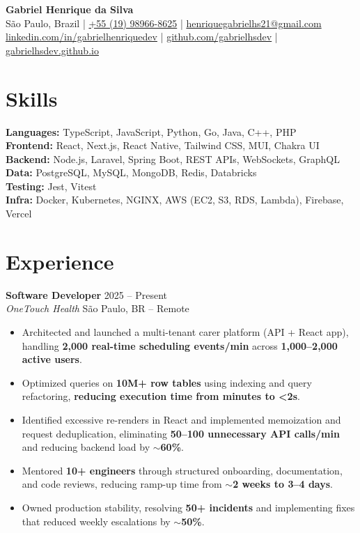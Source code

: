 \documentclass[11pt, a4paper]{article}
\begin{document}
\begin{center}
    {\LARGE\bfseries Gabriel Henrique da Silva} \\[3pt]
    S\~{a}o Paulo, Brazil \quad|\quad
    \href{tel:+5519989668625}{+55 (19) 98966-8625} \quad|\quad
    \href{mailto:henriquegabrielhs21@gmail.com}{henriquegabrielhs21@gmail.com} \\[2pt]
    \href{https://www.linkedin.com/in/gabrielhenriquedev}{linkedin.com/in/gabrielhenriquedev} \quad|\quad
    \href{https://github.com/gabrielhsdev}{github.com/gabrielhsdev}
    \quad|\quad
    \href{https://gabrielhsdev.github.io}{gabrielhsdev.github.io}
\end{center}

\section{Skills}

\textbf{Languages:} TypeScript, JavaScript, Python, Go, Java, C++, PHP \\
\textbf{Frontend:} React, Next.js, React Native, Tailwind CSS, MUI, Chakra UI \\
\textbf{Backend:} Node.js, Laravel, Spring Boot, REST APIs, WebSockets, GraphQL \\
\textbf{Data:} PostgreSQL, MySQL, MongoDB, Redis, Databricks \\
\textbf{Testing:} Jest, Vitest \\
\textbf{Infra:} Docker, Kubernetes, NGINX, AWS (EC2, S3, RDS, Lambda), Firebase, Vercel \\

\section{Experience}

\textbf{Software Developer} \hfill 2025 -- Present \\
\textit{OneTouch Health} \hfill S\~{a}o Paulo, BR -- Remote

\begin{itemize}
    \item Architected and launched a multi-tenant carer platform (API + React app), handling \textbf{2,000 real-time scheduling events/min} across \textbf{1,000--2,000 active users}.
    \item Optimized queries on \textbf{10M+ row tables} using indexing and query refactoring, \textbf{reducing execution time from minutes to <2s}.
    \item Identified excessive re-renders in React and implemented memoization and request deduplication, eliminating \textbf{50--100 unnecessary API calls/min} and reducing backend load by \textbf{$\sim$60\%}.
    \item Mentored \textbf{10+ engineers} through structured onboarding, documentation, and code reviews, reducing ramp-up time from \textbf{$\sim$2 weeks to 3--4 days}.
    \item Owned production stability, resolving \textbf{50+ incidents} and implementing fixes that reduced weekly escalations by \textbf{$\sim$50\%}.
\end{itemize}
\end{document}
